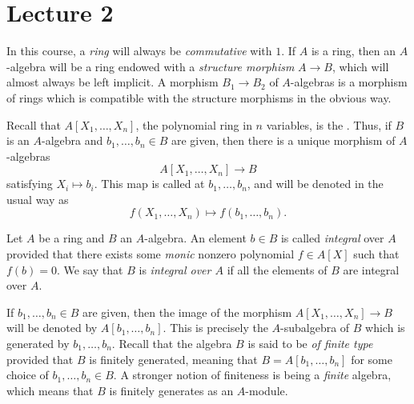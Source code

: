 \section{Lecture 2}

In this course, a \emph{ring} will always be \emph{commutative} with $1$.
If $A$ is a ring, then an $A$-algebra will be a ring endowed with a \emph{structure morphism} $A \to B$, which will almost always be left implicit.
A morphism $B_{1} \to B_{2}$ of $A$-algebras is a morphism of rings which is compatible with the structure morphisms in the obvious way.

Recall that $A[X_{1},\ldots,X_{n}]$, the polynomial ring in $n$ variables, is the .
Thus, if $B$ is an $A$-algebra and $b_{1},\ldots,b_{n} \in B$ are given, then there is a unique morphism of $A$-algebras
\[ A[X_{1},\ldots,X_{n}] \to B \]
satisfying $X_{i} \mapsto b_{i}$.
This map is called  at $b_{1},\ldots,b_{n}$, and will be denoted in the usual way as
\[ f(X_{1},\ldots,X_{n}) \mapsto f(b_{1},\ldots,b_{n}). \]


\begin{definition}
  Let $A$ be a ring and $B$ an $A$-algebra.
  An element $b \in B$ is called \emph{integral} over $A$ provided that there exists some \emph{monic} nonzero polynomial $f \in A[X]$ such that $f(b) = 0$.
  We say that $B$ is \emph{integral over $A$} if all the elements of $B$ are integral over $A$.
\end{definition}

If $b_{1},\ldots,b_{n} \in B$ are given, then the image of the morphism $A[X_{1},\ldots,X_{n}] \to B$ will be denoted by $A[b_{1},\ldots,b_{n}]$.
This is precisely the $A$-subalgebra of $B$ which is generated by $b_{1},\ldots,b_{n}$.
Recall that the algebra $B$ is said to be \emph{of finite type} provided that $B$ is finitely generated, meaning that $B = A[b_{1},\ldots,b_{n}]$ for some choice of $b_{1},\ldots,b_{n} \in B$.
A stronger notion of finiteness is being a \emph{finite} algebra, which means that $B$ is finitely generates as an $A$-module.

